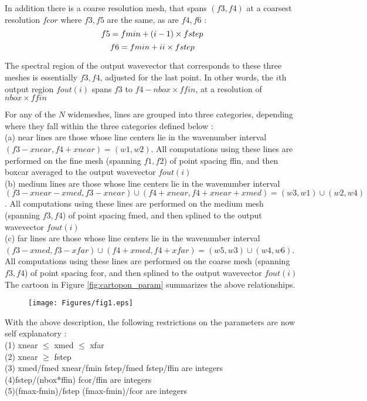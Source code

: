 \documentclass[11pt]{article}
\begin{document}
In addition there is a coarse resolution mesh, that spans 
$(f3,f4)$ at a coarsest resolution $fcor$ where $f3,f5$ are the same, as are
$f4,f6$ : 
\begin{displaymath}
f5 = fmin + (i-1) \times fstep\\
\end{displaymath}
\begin{equation}
f6 = fmin + ii \times fstep\\
\end{equation}

The spectral region of the output wavevector that corresponds to these 
three meshes is essentially $f3,f4$, adjusted for the last point. In other 
words, the
$i$th output region $fout(i)$ spans $f3$ to $f4-nbox \times ffin$, at a 
resolution of $nbox \times ffin$

For any of the $N$ widemeshes, lines are grouped into three categories, 
depending where they fall within the three categories defined below : \\
(a) near lines are those whose line centers lie in the wavenumber interval
$(f3-xnear,f4+xnear)=(w1,w2)$. All computations using these lines are 
performed on the fine mesh (spanning $f1,f2$) of point spacing ffin, 
and then boxcar averaged to the output wavevector $fout(i)$ \\
(b) medium lines are those whose line centers lie in the wavenumber interval
$(f3-xnear-xmed,f3-xnear) \cup (f4+xnear,f4+xnear+xmed)=(w3,w1) \cup (w2,w4)$. 
All computations using these lines are performed on the medium mesh 
(spanning $f3,f4$) of 
point spacing fmed, and then splined to the output wavevector $fout(i)$\\
(c) far lines are those whose line centers lie in the wavenumber interval
$(f3-xmed,f3-xfar)\cup(f4+xmed,f4+xfar)=(w5,w3)\cup (w4,w6)$. All 
computations using these lines are performed on the coarse mesh 
(spanning $f3,f4$) of 
point spacing fcor, and then splined to the output wavevector $fout(i)$\\
The cartoon in Figure \ref{fig:cartopon_param} summarizes the above 
relationships.

\begin{figure}[h]
  \begin{center}\texttt{[image: Figures/fig1.eps]}\end{center}
  \caption[Cartoon of Parameter Relations]{}
  \label{fig:cartoon_param}
\end{figure}

With the above description, the following restrictions on the parameters are
now self explanatory : \\
(1) xnear $\le$ xmed $\le$ xfar        \\
(2) xnear $\ge$ fstep              \\
(3) xmed/fmed  xnear/fmin   fstep/fmed   fstep/ffin       are integers \\
(4)fstep/(nbox*ffin)        fcor/ffin                     are integers \\
(5)(fmax-fmin)/fstep        (fmax-fmin)/fcor              are integers \\
\end{document}
